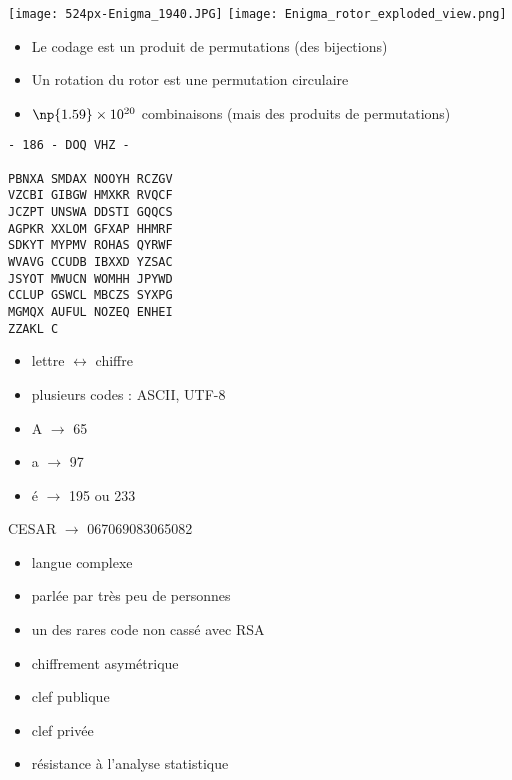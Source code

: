 \documentclass[french]{article}
\begin{document}
  \begin{multicols}{2}
    \texttt{[image: 524px-Enigma\_1940.JPG]}
    \texttt{[image: Enigma\_rotor\_exploded\_view.png]}
  \end{multicols}
  \begin{multicols}{2}
      \begin{itemize}
        \item Le codage est un produit de permutations (des bijections)
        \item Un rotation du rotor est une permutation circulaire
        \item $\np{1.59}\times 10^{20}$ combinaisons (mais des produits
          de permutations)
      \end{itemize}
      \begin{verbatim}
- 186 - DOQ VHZ -

PBNXA SMDAX NOOYH RCZGV
VZCBI GIBGW HMXKR RVQCF
JCZPT UNSWA DDSTI GQQCS
AGPKR XXLOM GFXAP HHMRF
SDKYT MYPMV ROHAS QYRWF
WVAVG CCUDB IBXXD YZSAC
JSYOT MWUCN WOMHH JPYWD
CCLUP GSWCL MBCZS SYXPG
MGMQX AUFUL NOZEQ ENHEI
ZZAKL C
\end{verbatim}
  \end{multicols}

  \begin{multicols}{2}
      \begin{itemize}
        \item lettre $\leftrightarrow$ chiffre
        \item plusieurs codes : ASCII, UTF-8
      \end{itemize}
      \begin{itemize}
        \item A $\rightarrow$ 65
        \item a $\rightarrow$ 97
        \item é $\rightarrow$ 195 ou 233
      \end{itemize}
      CESAR $\rightarrow$ 067069083065082
  \end{multicols}

  \begin{itemize}
    \item langue complexe
    \item parlée par très peu de personnes
    \item un des rares code non cassé avec RSA
  \end{itemize}

    \begin{itemize}
      \item chiffrement asymétrique
      \item clef publique
      \item clef privée
      \item résistance à l'analyse statistique
    \end{itemize}
\end{document}
